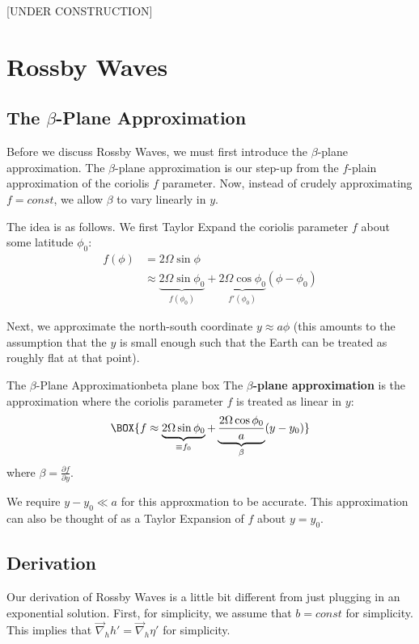 [UNDER CONSTRUCTION]

\section{Rossby Waves}

\subsection{The \texorpdfstring{$\beta$}{Beta}-Plane Approximation}

Before we discuss Rossby Waves, we must first introduce the $\beta$-plane approximation. The $\beta$-plane approximation is our step-up from the $f$-plain approximation of the coriolis $f$ parameter. Now, instead of crudely approximating $f=const$, we allow $\beta$ to vary linearly in $y$.

The idea is as follows. We first Taylor Expand the coriolis parameter $f$ about some latitude $\phi_0$:
\begin{align*}
    f(\phi)&=2\Omega \sin \phi\\
    &\approx \underbrace{2\Omega \sin \phi_0}_{f(\phi_0)}+\underbrace{2\Omega \cos \phi_0}_{f'(\phi_0)} (\phi-\phi_0)
\end{align*}

Next, we approximate the north-south coordinate $y\approx a\phi$ (this amounts to the assumption that the $y$ is small enough such that the Earth can be treated as roughly flat at that point).
\begin{fact}{The $\beta$-Plane Approximation}{beta plane box}\label{beta plane box}
    The \textbf{$\beta$-plane approximation} is the approximation where the coriolis parameter $f$ is treated as linear in $y$:
    \begin{align*}
        \BOX{f\approx \underbrace{2\Omega\sin\phi_0}_{\equiv f_0}+\underbrace{\frac{2\Omega\cos\phi_0}{a}}_{\beta} (y-y_0)}
    \end{align*}
    where $\beta=\frac{\partial f}{\partial y}$.

    We require $y-y_0\ll a$ for this approxmation to be accurate. This approximation can also be thought of as a Taylor Expansion of $f$ about $y=y_0$.
\end{fact}

\subsection{Derivation}

Our derivation of Rossby Waves is a little bit different from just plugging in an exponential solution. First, for simplicity, we assume that $b=const$ for simplicity. This implies that $\vec{\nabla}_h h'=\vec{\nabla}_h \eta'$ for simplicity. 

